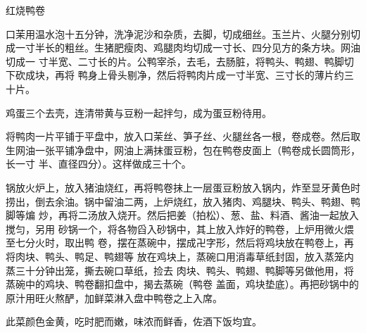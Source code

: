 \begin{recipe}{红烧鸭卷}

\ingredients


\preparation

\step 口茉用温水泡十五分钟，洗净泥沙和杂质，去脚，切成细丝。玉兰片、火腿分别切
成一寸半长的粗丝。生猪肥瘦肉、鸡腿肉均切成一寸长、四分见方的条方块。网油切成一
寸半宽、二寸长的片。公鸭宰杀，去毛，去肠脏，将鸭头、鸭翅、鸭脚切下砍成块，再将
鸭身上骨头剔净，然后将鸭肉片成一寸半宽、三寸长的薄片约三十片。

\step 鸡蛋三个去壳，连清带黄与豆粉一起拌匀，成为蛋豆粉待用。

\step 将鸭肉一片平铺于平盘中，放入口茉丝、笋子丝、火腿丝各一根，卷成卷。然后取
生网油一张平铺净盘中，网油上满抹蛋豆粉，包在鸭卷皮面上（鸭卷成长圆筒形，长一寸
半、直径四分）。这样做成三十个。

\step 锅放火炉上，放入猪油烧红，再将鸭卷抹上一层蛋豆粉放入锅内，炸至显牙黄色时
捞出，倒去余油。锅中留油二两，上炉烧红，放入猪肉、鸡腿块、鸭头、鸭翅、鸭脚等煸
炒，再将二汤放入烧开。然后把姜（拍松）、葱、盐、料酒、酱油一起放入搅匀，另用
砂锅一个，将各物舀入砂锅中，其上放入炸好的鸭卷，上炉用微火煨至七分火时，取出鸭
卷，摆在蒸碗中，摆成卍字形，然后将鸡块放在鸭卷上，再将肉块、鸭头、鸭足、鸭翅等
放在鸡块上，蒸碗口用消毒草纸封固，放入蒸笼内蒸三十分钟出笼，撕去碗口草纸，捡去
肉块、鸭头、鸭翅、鸭脚等另做他用，将蒸碗中的鸡块、鸭卷翻扣盘中，揭去蒸碗（鸭卷
盖面，鸡块垫底）。再把砂锅中的原汁用旺火熬酽，加鲜菜淋入盘中鸭卷之上入席。

\features

此菜颜色金黄，吃时肥而嫩，味浓而鲜香，佐酒下饭均宜。

\end{recipe}

